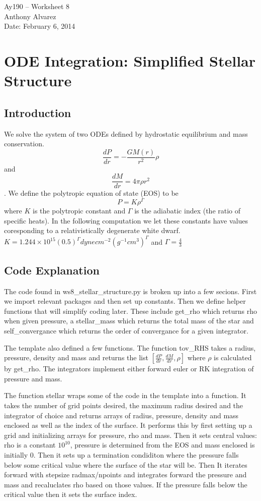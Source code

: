 \documentclass[11pt,letterpaper]{article}
\begin{document}
\begin{center}
\Large
Ay190 -- Worksheet 8\\
Anthony Alvarez\\
Date: February 6, 2014
\end{center}

\section{ODE Integration: Simplified Stellar Structure}

\subsection{Introduction}

We solve the system of two ODEs defined by hydrostatic equilibrium and mass
conservation. $$ \frac{dP}{dr} = - \frac{GM(r)}{r^2}\rho$$ and 
$$\frac{dM}{dr} = 4\pi\rho r^2$$. We define the polytropic equation of state
(EOS) to be $$P = K\rho^\Gamma$$ where $K$ is the polytropic constant 
and $\Gamma$
is the adiabatic index (the ratio of specific heats). In the following
computation we let these constants have values coresponding to a relativistically
degenerate white dwarf. $ K = 1.244 \times 10^{15} (0.5)^\Gamma dyne cm^{-2} (g
^{-1} cm^3)^\Gamma$ and $\Gamma = \frac43$

\subsection{Code Explanation}

The code found in ws8\_stellar\_structure.py is broken up into a few secions.
First we import relevant packages and then set up constants. Then we define 
helper functions that will simplify coding later. These include get\_rho
 which returns rho when given pressure, a stellar\_mass which 
returns the total mass of the star and self\_convergance which returns the order
of convergance for a given integrator.

The template also defined a few functions. The function tov\_RHS takes a radius,
pressure, density and mass and returns the list $[\frac{dP}{dr}, \frac{dM}{dr}, 
\rho]$ where $\rho$ is calculated by get\_rho. The integrators implement either
forward euler or RK integration of pressure and mass. 

The function stellar wraps some of the code in the template into a function. It
takes the number of grid points desired, the maximum radius desired and the 
integrator of choice and returns arrays of radius, pressure, density and mass
 enclosed as well as the index of the surface. It performs this by first 
setting up a grid and initializing arrays for pressure, rho and mass. Then it 
sets central values: rho is a constant $10^{10}$, pressure is determined from
the EOS and mass enclosed is initially 0. Then it sets up a termination
condiditon where the pressure falls below some critical value where the surface
of the star will be. Then It iterates forward with stepsize radmax/npoints and
integrates forward the pressure and mass and recaluclates rho based on those
values. If the pressure falls below the critical value then it sets the surface
index. 
\end{document}
